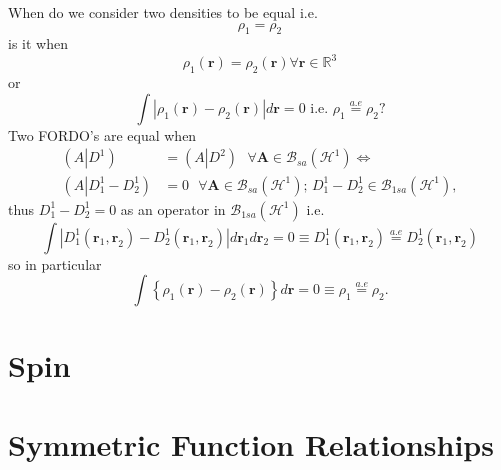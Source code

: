 \documentclass[aps,preprint]{revtex4}%
\begin{document}
When do we consider two densities to be equal i.e.
\begin{equation}
\rho_{1}=\rho_{2}%
\end{equation}
is it when
\begin{equation}
\rho_{1}\left(  \mathbf{r}\right)  =\rho_{2}\left(  \mathbf{r}\right)  \text{
}\forall\mathbf{r\in}\mathbb{R}^{3}%
\end{equation}
or
\begin{equation}
\int\left\vert \rho_{1}\left(  \mathbf{r}\right)  -\rho_{2}\left(
\mathbf{r}\right)  \right\vert d\mathbf{r}=0\text{ i.e. }\rho_{1}%
\overset{a.e}{=}\rho_{2}?
\end{equation}
Two FORDO's are equal when
\begin{align}
\left(  A\left\vert D^{1}\right.  \right)   &  =\left(  A\left\vert
D^{2}\right.  \right)  \text{ }\forall\mathbf{A\in}\mathcal{B}_{sa}\left(
\mathcal{H}^{1}\right)  \Longleftrightarrow\\
\left(  A\left\vert D_{1}^{1}-D_{2}^{1}\right.  \right)   &  =0\text{ }%
\forall\mathbf{A\in}\mathcal{B}_{sa}\left(  \mathcal{H}^{1}\right)
;\,D_{1}^{1}-D_{2}^{1}\in\mathcal{B}_{1sa}\left(  \mathcal{H}^{1}\right)  ,
\end{align}
thus $D_{1}^{1}-D_{2}^{1}=0$ as an operator in $\mathcal{B}_{1sa}\left(
\mathcal{H}^{1}\right)  $ i.e.
\begin{equation}
\int\left\vert D_{1}^{1}\left(  \mathbf{r}_{1}\mathbf{,r}_{2}\right)
-D_{2}^{1}\left(  \mathbf{r}_{1}\mathbf{,r}_{2}\right)  \right\vert
d\mathbf{r}_{1}d\mathbf{r}_{2}=0\equiv D_{1}^{1}\left(  \mathbf{r}%
_{1}\mathbf{,r}_{2}\right)  \overset{a.e}{=}D_{2}^{1}\left(  \mathbf{r}%
_{1}\mathbf{,r}_{2}\right)
\end{equation}
so in particular
\begin{equation}
\int\left\{  \rho_{1}\left(  \mathbf{r}\right)  -\rho_{2}\left(
\mathbf{r}\right)  \right\}  d\mathbf{r}=0\equiv\rho_{1}\overset{a.e}{=}%
\rho_{2}.
\end{equation}


\section{Spin\label{Spin}}

\section{Symmetric Function Relationships}



\end{document}
